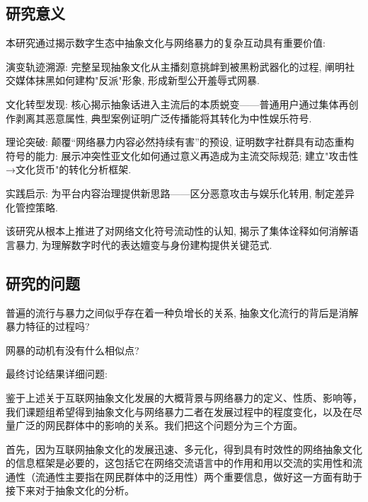 \documentclass[12pt,a4paper]{ctexart}
\begin{document}
\subsection{研究意义}%

本研究通过揭示数字生态中抽象文化与网络暴力的复杂互动具有重要价值:

演变轨迹溯源: 完整呈现抽象文化从主播刻意挑衅到被黑粉武器化的过程, 阐明社交媒体抹黑如何建构"反派"形象, 形成新型公开羞辱式网暴.

文化转型发现: 核心揭示抽象话进入主流后的本质蜕变——普通用户通过集体再创作剥离其恶意属性, 典型案例证明广泛传播能将其转化为中性娱乐符号.

理论突破: 颠覆“网络暴力内容必然持续有害”的预设, 证明数字社群具有动态重构符号的能力: 展示冲突性亚文化如何通过意义再造成为主流交际规范; 建立"攻击性→文化货币"的转化分析框架.

实践启示: 为平台内容治理提供新思路——区分恶意攻击与娱乐化转用, 制定差异化管控策略.

该研究从根本上推进了对网络文化符号流动性的认知, 揭示了集体诠释如何消解语言暴力, 为理解数字时代的表达嬗变与身份建构提供关键范式.

\subsection{研究的问题}%


普遍的流行与暴力之间似乎存在着一种负增长的关系, 抽象文化流行的背后是消解暴力特征的过程吗?


网暴的动机有没有什么相似点?




最终讨论结果详细问题:

鉴于上述关于互联网抽象文化发展的大概背景与网络暴力的定义、性质、影响等，我们课题组希望得到抽象文化与网络暴力二者在发展过程中的程度变化，以及在尽量广泛的网民群体中的影响的关系。我们把这个问题分为三个方面。

首先，因为互联网抽象文化的发展迅速、多元化，得到具有时效性的网络抽象文化的信息框架是必要的，这包括它在网络交流语言中的作用和用以交流的实用性和流通性（流通性主要指在网民群体中的泛用性）两个重要信息，做好这一方面有助于接下来对于抽象文化的分析。
\end{document}
